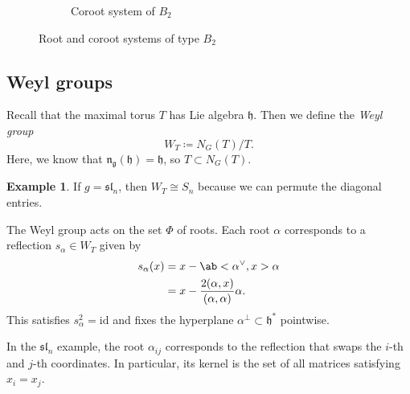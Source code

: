 \documentclass{amsart}
\theoremstyle{definition}
\newtheorem{exm}[thm]{Example}
\theoremstyle{remark}
\theoremstyle{plain}
\theoremstyle{definition}
\theoremstyle{remark}
\newcommand{\g}{\mathfrak{g}}
\newcommand{\h}{\mathfrak{h}}
\newcommand{\n}{\mathfrak{n}}
\newcommand{\mf}[1]{\mathfrak{#1}}
\newcommand{\mr}[1]{\mathrm{#1}}
\newcommand{\1}{\mathbf{1}}
\newcommand{\2}{\mathbf{2}}
\newcommand{\3}{\mathbf{3}}
\renewcommand{\sl}{\mf{sl}}
\begin{document}
\begin{figure}[htpb!]
\begin{subfigure}{0.5\textwidth}
\begin{center}
{}
        \end{center}
        \caption{Coroot system of \(B_2\)}
        \label{fig:b2-coroots}
    \end{subfigure}
    \caption{Root and coroot systems of type \(B_2\)}%
    \label{fig:b2-root-coroot}
\end{figure}


\subsection{Weyl groups}%
\label{sub:Weyl groups}

Recall that the maximal torus \(T\) has Lie algebra \(\h\). Then we define the \textit{Weyl group}
\[ W_T \coloneqq N_G(T) / T. \]
Here, we know that \(\n_{\g}(\h) = \h\), so \(T \subset N_G(T)\).

\begin{exm}
    If \(g = \sl_n\), then \(W_T \cong S_n\) because we can permute the diagonal entries.
\end{exm}

The Weyl group acts on the set \(\Phi\) of roots. Each root \(\alpha\) corresponds to a reflection \(s_{\alpha} \in W_T\) given by
\begin{align*}
    s_{\alpha}(x) &= x - \ab<\alpha^{\vee}, x>\alpha \\
    &= x - \frac{2 (\alpha, x)}{(\alpha, \alpha)} \alpha.
\end{align*}
This satisfies \(s_{\alpha}^2 = \mr{id}\) and fixes the hyperplane \(\alpha^{\perp} \subset \h^*\) pointwise. 

In the \(\sl_n\) example, the root \(\alpha_{ij}\) corresponds to the reflection that swaps the \(i\)-th and \(j\)-th coordinates. In particular, its kernel is the set of all matrices satisfying \(x_i = x_j\).
\end{document}
